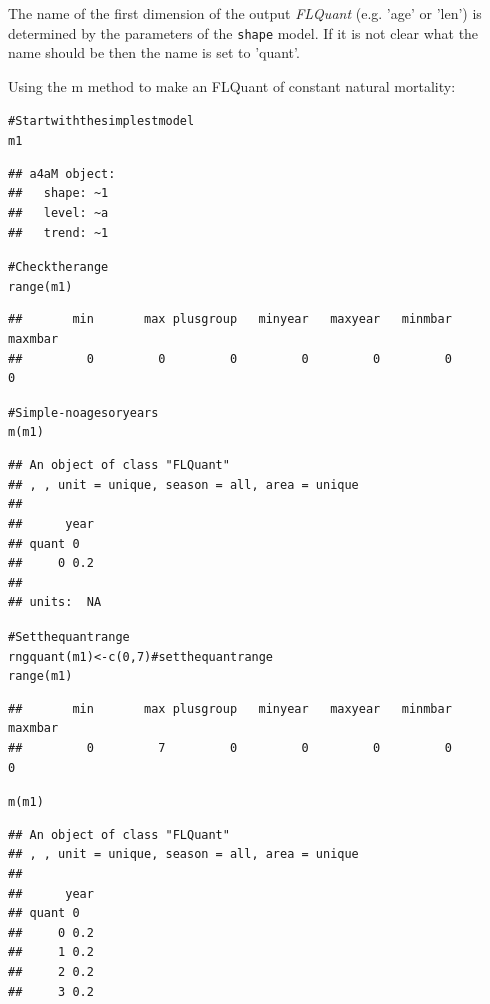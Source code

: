 \documentclass[a4paper,english,10pt]{article}\usepackage[]{graphicx}\usepackage[]{color}
\makeatletter
\newcommand{\hlnum}[1]{\textcolor[rgb]{0.2,0.2,0.2}{#1}}%
\newcommand{\hlcom}[1]{\textcolor[rgb]{0.2,0.267,0.4}{#1}}%
\newcommand{\hlstd}[1]{\textcolor[rgb]{0,0,0}{#1}}%
\newcommand{\hlkwb}[1]{\textcolor[rgb]{0.361,0.506,0.596}{#1}}%
\newcommand{\hlkwd}[1]{\textcolor[rgb]{0.361,0.506,0.596}{#1}}%
\newenvironment{kframe}{%
 \def\at@end@of@kframe{}%
 \ifinner\ifhmode%
  \def\at@end@of@kframe{\end{minipage}}%
  \begin{minipage}{\columnwidth}%
 \fi\fi%
 \def\FrameCommand##1{\hskip\@totalleftmargin \hskip-\fboxsep
 \colorbox{shadecolor}{##1}\hskip-\fboxsep
     \hskip-\linewidth \hskip-\@totalleftmargin \hskip\columnwidth}%
 \MakeFramed {\advance\hsize-\width
   \@totalleftmargin\z@ \linewidth\hsize
   \@setminipage}}%
 {\par\unskip\endMakeFramed%
 \at@end@of@kframe}
\newenvironment{knitrout}{}{} %
\newcommand{\code}[1]{{\texttt{#1}}}
\newcommand{\class}[1]{{\textit{#1}}}
\makeatother
\begin{document}
The name of the first dimension of the output \class{FLQuant} (e.g. 'age' or 'len') is determined by the parameters of the \code{shape} model. If it is not clear what the name should be then the name is set to 'quant'.

Using the m method to make an FLQuant of constant natural mortality:

\begin{knitrout}
\color{fgcolor}\begin{kframe}
\begin{alltt}
\hlcom{# Start with the simplest model}
\hlstd{m1}
\end{alltt}
\begin{verbatim}
## a4aM object:
##   shape: ~1
##   level: ~a
##   trend: ~1
\end{verbatim}
\begin{alltt}
\hlcom{# Check the range}
\hlkwd{range}\hlstd{(m1)}
\end{alltt}
\begin{verbatim}
##       min       max plusgroup   minyear   maxyear   minmbar   maxmbar 
##         0         0         0         0         0         0         0
\end{verbatim}
\begin{alltt}
\hlcom{# Simple - no ages or years}
\hlkwd{m}\hlstd{(m1)}
\end{alltt}
\begin{verbatim}
## An object of class "FLQuant"
## , , unit = unique, season = all, area = unique
## 
##      year
## quant 0  
##     0 0.2
## 
## units:  NA
\end{verbatim}
\begin{alltt}
\hlcom{# Set the quant range}
\hlkwd{rngquant}\hlstd{(m1)} \hlkwb{<-} \hlkwd{c}\hlstd{(}\hlnum{0}\hlstd{,} \hlnum{7}\hlstd{)}  \hlcom{# set the quant range}
\hlkwd{range}\hlstd{(m1)}
\end{alltt}
\begin{verbatim}
##       min       max plusgroup   minyear   maxyear   minmbar   maxmbar 
##         0         7         0         0         0         0         0
\end{verbatim}
\begin{alltt}
\hlkwd{m}\hlstd{(m1)}
\end{alltt}
\begin{verbatim}
## An object of class "FLQuant"
## , , unit = unique, season = all, area = unique
## 
##      year
## quant 0  
##     0 0.2
##     1 0.2
##     2 0.2
##     3 0.2

\end{verbatim}
\end{kframe}
\end{knitrout}
\end{document}
